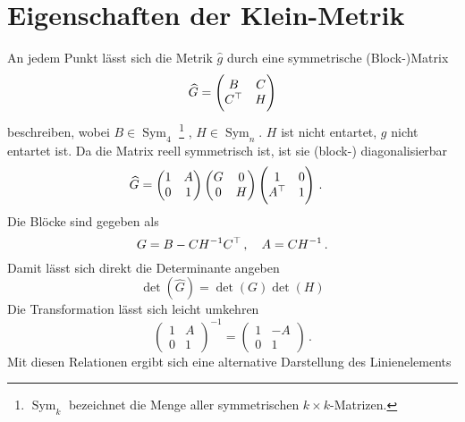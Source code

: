 \section{Eigenschaften der Klein-Metrik}
An jedem Punkt lässt sich die Metrik $\hat{g}$ durch eine symmetrische
(Block-)Matrix
\begin{equation}
\widehat{G}=\begin{pmatrix}B& C\\
C^\top& H\end{pmatrix}
\end{equation}
beschreiben, wobei
$B\in\operatorname{Sym}_4$
\footnote{$\operatorname{Sym}_k$ bezeichnet die Menge aller symmetrischen
$k\times k$-Matrizen.} , $H\in\operatorname{Sym}_n$.
$H$ ist nicht entartet, $g$ nicht entartet ist. 
Da die Matrix reell symmetrisch ist, ist sie (block-) diagonalisierbar
\begin{equation}
\begin{split}
\widehat{G}
&=
\begin{pmatrix}1& A\\0& 1\end{pmatrix}
\begin{pmatrix}G& 0\\0& H
\end{pmatrix}
\begin{pmatrix}1& 0\\A^\top& 1\end{pmatrix}\,.
\end{split}
\end{equation}
Die Blöcke sind gegeben als
\begin{equation}
G=B-CH^{-1}C^\top\,,\quad A=CH^{-1}\,.
\end{equation}
Damit lässt sich direkt die Determinante angeben
\begin{equation}
\det(\hat{G})=\det(G)\det(H)
\end{equation}
Die Transformation lässt sich leicht umkehren
\begin{equation}
\begin{pmatrix}1& A\\0& 1\end{pmatrix}^{-1}=\begin{pmatrix}1& -A\\0&
1\end{pmatrix}\,.
\end{equation}
Mit diesen Relationen ergibt sich eine alternative Darstellung des
Linienelements

